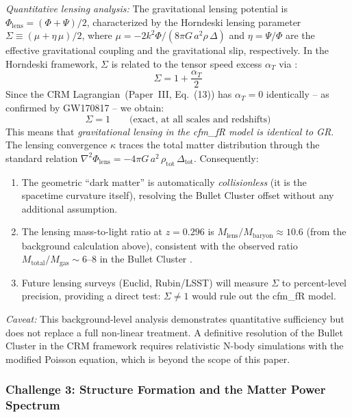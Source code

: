 \documentclass[aps,prd,twocolumn,superscriptaddress,nofootinbib]{revtex4-2}
\begin{document}
\textit{Quantitative lensing analysis:} The gravitational lensing potential is $\Phi_{\mathrm{lens}} = (\Phi + \Psi)/2$, characterized by the Horndeski lensing parameter $\Sigma \equiv (\mu + \eta\,\mu)/2$, where $\mu = -2k^2\Phi/(8\pi G\,a^2\rho\,\Delta)$ and $\eta = \Psi/\Phi$ are the effective gravitational coupling and the gravitational slip, respectively. In the Horndeski framework, $\Sigma$ is related to the tensor speed excess $\alpha_T$ via \cite{Amendola2018}:
\begin{equation}
\Sigma = 1 + \frac{\alpha_T}{2}
\end{equation}
Since the CRM Lagrangian~(Paper~III, Eq.~(13)) has $\alpha_T = 0$ identically -- as confirmed by GW170817 \cite{Abbott2017gw} -- we obtain:
\begin{equation}
\Sigma = 1 \qquad \text{(exact, at all scales and redshifts)}
\end{equation}
This means that \textit{gravitational lensing in the cfm\_fR model is identical to GR}. The lensing convergence $\kappa$ traces the total matter distribution through the standard relation $\nabla^2\Phi_{\mathrm{lens}} = -4\pi G\,a^2\,\rho_{\mathrm{tot}}\,\Delta_{\mathrm{tot}}$. Consequently:
\begin{enumerate}
\item The geometric ``dark matter'' is automatically \textit{collisionless} (it is the spacetime curvature itself), resolving the Bullet Cluster offset without any additional assumption.
\item The lensing mass-to-light ratio at $z = 0.296$ is $M_{\mathrm{lens}}/M_{\mathrm{baryon}} \approx 10.6$ (from the background calculation above), consistent with the observed ratio $M_{\mathrm{total}}/M_{\mathrm{gas}} \sim 6$--$8$ in the Bullet Cluster \cite{Clowe2006}.
\item Future lensing surveys (Euclid, Rubin/LSST) will measure $\Sigma$ to percent-level precision, providing a direct test: $\Sigma \neq 1$ would rule out the cfm\_fR model.
\end{enumerate}

\textit{Caveat:} This background-level analysis demonstrates quantitative sufficiency but does not replace a full non-linear treatment. A definitive resolution of the Bullet Cluster in the CRM framework requires relativistic N-body simulations with the modified Poisson equation, which is beyond the scope of this paper.

\subsubsection{Challenge 3: Structure Formation and the Matter Power Spectrum}
\end{document}
